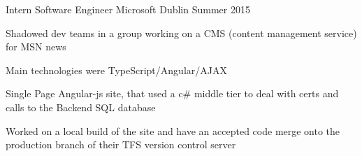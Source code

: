 

\begin{cventries}

  \cventry
    {Intern Software Engineer} %
    {Microsoft} %
    {Dublin} %
    {Summer 2015} %
    {
      \begin{cvitems} %
        \item {Shadowed dev teams in a group working on a CMS (content management service) for MSN news}
        \item {Main technologies were TypeScript/Angular/AJAX}
        \item {Single Page Angular-js site, that used a c\# middle tier to deal with certs and calls to the Backend SQL database}
        \item {Worked on a local build of the site and have an accepted code merge onto the production branch of their TFS version control server}
      \end{cvitems}
    }



\end{cventries}
